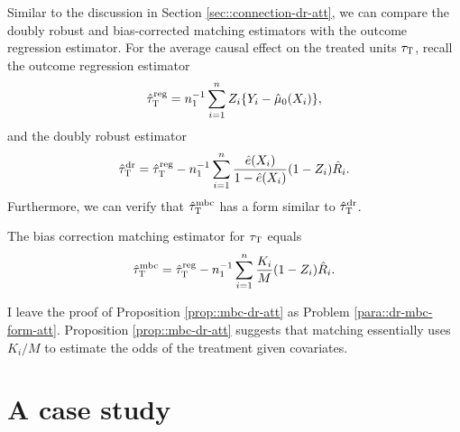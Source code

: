 
 Similar to the discussion in Section \ref{sec::connection-dr-att}, we can compare the doubly robust and bias-corrected matching estimators with the outcome regression estimator. 
 For the average causal effect on the treated units $\tau_\textsc{T}$, recall the outcome regression estimator 
$$
\hat{\tau}^{\textup{reg}}_\textsc{T} = n_1^{-1} \sum_{i=1}^n Z_i \{ Y_i - \hat{\mu}_0(X_i) \} ,
$$
and the doubly robust estimator
$$
\hat{\tau}_\textsc{T}^\textup{dr} =  \hat{\tau}^{\textup{reg}}_\textsc{T} 
- n_1^{-1} \sum_{i=1}^n \frac{  \hat{e}(X_i) }{ 1- \hat{e}(X_i) }  (1-Z_i)  \hat{R}_i .
$$
Furthermore, we can verify that $\hat{\tau}_\textsc{T}^\textup{mbc} $ has a form similar to $\hat{\tau}_\textsc{T}^\textup{dr} $. 
\begin{proposition}
\label{prop::mbc-dr-att}
The bias correction matching estimator for  $\tau_\textsc{T}$ equals
$$
\hat{\tau}_\textsc{T}^\textup{mbc}   = \hat{\tau}^{\textup{reg}}_\textsc{T} 
 - n_1^{-1} \sum_{i=1}^n { K_i\over M}  (1-Z_i)  \hat{R}_i.
$$
\end{proposition}


I leave the proof of Proposition \ref{prop::mbc-dr-att}  as Problem \ref{para::dr-mbc-form-att}.  Proposition \ref{prop::mbc-dr-att} suggests that matching essentially uses $K_i/M$ to estimate the odds of the treatment given covariates. 




\section{A case study}
\label{sec::matching-application}



